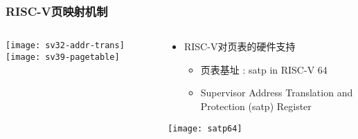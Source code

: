 \begin{frame}   
	\frametitle{RISC-V页映射机制}
	
	\begin{columns}[t]
		
		\begin{column}{.4\textwidth}
	
	\centering
	\texttt{[image: sv32-addr-trans]}
	\texttt{[image: sv39-pagetable]}
			
		\end{column}
		
		
		\begin{column}{.5\textwidth}
			
			\begin{itemize}\large
				\item RISC-V对页表的硬件支持
				\begin{itemize}
					\item 页表基址 : satp in RISC-V 64
					\item  Supervisor Address Translation and Protection (satp) Register
					
					
				\end{itemize}
			\end{itemize}
             \texttt{[image: satp64]}
		\end{column}
		
		
	\end{columns}
	
\end{frame}


